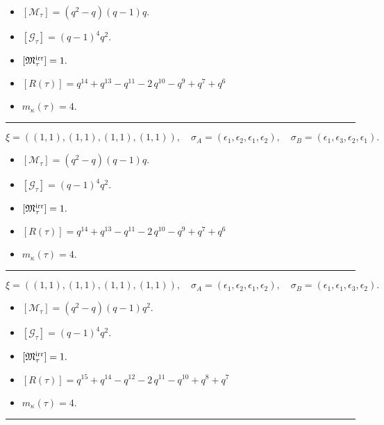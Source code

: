 \documentclass[10pt,a4paper]{amsart}
\begin{document}
\begin{itemize}
 \item $[\mathcal{M}_{\tau}] = {\left(q^{2} - q\right)} {\left(q - 1\right)} q .$

 \item $[\mathcal{G}_{\tau}] = {\left(q - 1\right)}^{4} q^{2} .$

 \item $[{\frak M}_{\tau}^{\textrm{irr}}] = 1 .$

 \item $[R(\tau)] = q^{14} + q^{13} - q^{11} - 2 \, q^{10} - q^{9} + q^{7} + q^{6} $

 \item $m_{\kappa}(\tau) = 4 .$

 \end{itemize}
\noindent\rule{8cm}{0.4pt}

$$\xi = ({(1, 1), (1, 1)}, {(1, 1)}, {(1, 1)}),\quad \sigma_A = ({{\epsilon_1}, {\epsilon_2}}, {{\epsilon_1}}, {{\epsilon_2}}),\quad \sigma_B = ({{\epsilon_1}, {\epsilon_3}}, {{\epsilon_2}}, {{\epsilon_1}}).$$

\begin{itemize}
 \item $[\mathcal{M}_{\tau}] = {\left(q^{2} - q\right)} {\left(q - 1\right)} q .$

 \item $[\mathcal{G}_{\tau}] = {\left(q - 1\right)}^{4} q^{2} .$

 \item $[{\frak M}_{\tau}^{\textrm{irr}}] = 1 .$

 \item $[R(\tau)] = q^{14} + q^{13} - q^{11} - 2 \, q^{10} - q^{9} + q^{7} + q^{6} $

 \item $m_{\kappa}(\tau) = 4 .$

 \end{itemize}
\noindent\rule{8cm}{0.4pt}

$$\xi = ({(1, 1), (1, 1)}, {(1, 1)}, {(1, 1)}),\quad \sigma_A = ({{\epsilon_1}, {\epsilon_2}}, {{\epsilon_1}}, {{\epsilon_2}}),\quad \sigma_B = ({{\epsilon_1}, {\epsilon_1}}, {{\epsilon_3}}, {{\epsilon_2}}).$$

\begin{itemize}
 \item $[\mathcal{M}_{\tau}] = {\left(q^{2} - q\right)} {\left(q - 1\right)} q^{2} .$

 \item $[\mathcal{G}_{\tau}] = {\left(q - 1\right)}^{4} q^{2} .$

 \item $[{\frak M}_{\tau}^{\textrm{irr}}] = 1 .$

 \item $[R(\tau)] = q^{15} + q^{14} - q^{12} - 2 \, q^{11} - q^{10} + q^{8} + q^{7} $

 \item $m_{\kappa}(\tau) = 4 .$

 \end{itemize}
\noindent\rule{8cm}{0.4pt}
\end{document}
